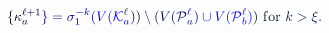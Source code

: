\documentclass[12pt]{article}
\begin{document}
\makeatletter
\renewcommand*{\@textcolor}[3]{%
  \protect\leavevmode
  \begingroup
    \color#1{#2}#3%
  \endgroup
}
\makeatother
\begin{displaymath}
\mathcolor[RGB]{0,0,15}{\{} \mathcolor[RGB]{0,0,30}{\kappa} _ { \mathcolor[RGB]{0,0,45}{a} } ^ { \mathcolor[RGB]{0,0,60}{\ell} \mathcolor[RGB]{0,0,75}{+} \mathcolor[RGB]{0,0,90}{1} } \mathcolor[RGB]{0,0,105}{\}} \mathcolor[RGB]{0,0,120}{=} \mathcolor[RGB]{0,0,135}{\sigma} _ { \mathcolor[RGB]{0,0,150}{1} } ^ { \mathcolor[RGB]{0,0,165}{-} \mathcolor[RGB]{0,0,180}{k} } \mathcolor[RGB]{0,0,195}{(} \mathcolor[RGB]{0,0,210}{V} \mathcolor[RGB]{0,0,225}{(} \mathcal { \mathcolor[RGB]{0,0,240}{K} } _ { \mathcolor[RGB]{0,0,255}{a} } ^ { \mathcolor[RGB]{0,15,0}{\ell} } \mathcolor[RGB]{0,15,15}{)} \mathcolor[RGB]{0,15,30}{)} \mathcolor[RGB]{0,15,45}{\setminus} \mathcolor[RGB]{0,15,60}{(} \mathcolor[RGB]{0,15,75}{V} \mathcolor[RGB]{0,15,90}{(} \mathcal { \mathcolor[RGB]{0,15,105}{P} } _ { \mathcolor[RGB]{0,15,120}{a} } ^ { \mathcolor[RGB]{0,15,135}{\ell} } \mathcolor[RGB]{0,15,150}{)} \mathcolor[RGB]{0,15,165}{\cup} \mathcolor[RGB]{0,15,180}{V} \mathcolor[RGB]{0,15,195}{(} \mathcal { \mathcolor[RGB]{0,15,210}{P} } _ { \mathcolor[RGB]{0,15,225}{b} } ^ { \mathcolor[RGB]{0,15,240}{\ell} } \mathcolor[RGB]{0,15,255}{)} \mathcolor[RGB]{0,30,0}{)} \mathrm { ~ \mathcolor[RGB]{0,30,15}{f} \mathcolor[RGB]{0,30,30}{o} \mathcolor[RGB]{0,30,45}{r} ~ } \mathcolor[RGB]{0,30,60}{k} \mathcolor[RGB]{0,30,75}{>} \mathcolor[RGB]{0,30,90}{\xi} \mathcolor[RGB]{0,30,105}{.}
\end{displaymath}
\end{document}
